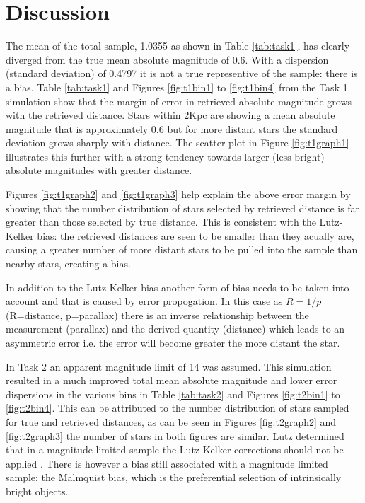\documentclass[a4paper,12pt]{article}
\begin{document}
\newpage
\section{Discussion}
The mean of the total sample, 1.0355 as shown in Table \ref{tab:task1}, has clearly diverged from the true mean absolute magnitude of 0.6. With a dispersion (standard deviation) of 0.4797 it is not a true representive of the sample: there is a bias. Table \ref{tab:task1} and Figures \ref{fig:t1bin1} to \ref{fig:t1bin4} from the Task 1 simulation show that the margin of error in retrieved absolute magnitude grows with the retrieved distance. Stars within 2Kpc are showing a mean absolute magnitude that is approximately 0.6 but for more distant stars the standard deviation grows sharply with distance. The scatter plot in Figure \ref{fig:t1graph1} illustrates this further with a strong tendency towards larger (less bright) absolute magnitudes with greater distance.

Figures \ref{fig:t1graph2} and \ref{fig:t1graph3} help explain the above error margin by showing that the number distribution of stars selected by retrieved distance is far greater than those selected by true distance. This is consistent with the Lutz-Kelker bias: the retrieved distances are seen to be smaller than they acually are, causing a greater number of more distant stars to be pulled into the sample than nearby stars, creating a bias.

In addition to the Lutz-Kelker bias another form of bias needs to be taken into account and that is caused by error propogation. In this case as $R=1/p$ (R=distance, p=parallax) there is an inverse relationship between the measurement (parallax) and the derived quantity (distance) which leads to an asymmetric error i.e. the error will become greater the more distant the star.

In Task 2 an apparent magnitude limit of 14 was assumed. This simulation resulted in a much improved total mean absolute magnitude and lower error dispersions in the various bins in Table \ref{tab:task2} and Figures \ref{fig:t2bin1} to \ref{fig:t2bin4}. This can be attributed to the number distribution of stars sampled for true and retrieved distances, as can be seen in Figures \ref{fig:t2graph2} and \ref{fig:t2graph3} the number of stars in both figures are similar. Lutz determined that in a magnitude limited sample the Lutz-Kelker corrections should not be applied \citep{lutz2}. There is however a bias still associated with a magnitude limited sample: the Malmquist bias, which is the preferential selection of intrinsically bright objects.
\end{document}
